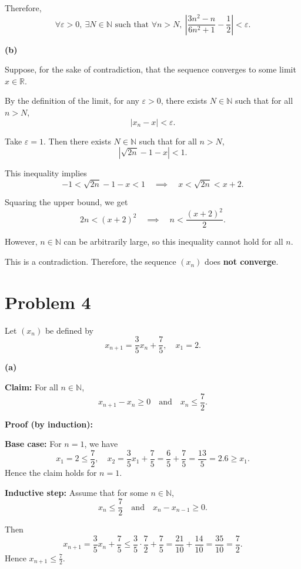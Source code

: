 \documentclass[12pt]{article}
\begin{document}
Therefore,
\[
	\forall \varepsilon > 0, \ \exists N \in \mathbb{N} \text{ such that } \forall n > N, \
	\left| \frac{3n^2 - n}{6n^2 + 1} - \frac{1}{2} \right| < \varepsilon.
\]

\bigskip

\textbf{(b)}

Suppose, for the sake of contradiction, that the sequence converges to some limit $x \in \mathbb{R}$.

By the definition of the limit, for any $\varepsilon > 0$, there exists $N \in \mathbb{N}$ such that for all $n > N$,
\[
	|x_n - x| < \varepsilon.
\]

Take $\varepsilon = 1$. Then there exists $N \in \mathbb{N}$ such that for all $n > N$,
\[
	\left| \sqrt{2n} - 1 - x \right| < 1.
\]

This inequality implies
\[
	-1 < \sqrt{2n} - 1 - x < 1 \quad \implies \quad x < \sqrt{2n} < x + 2.
\]

Squaring the upper bound, we get
\[
	2n < (x + 2)^2 \quad \implies \quad n < \frac{(x + 2)^2}{2}.
\]

However, $n \in \mathbb{N}$ can be arbitrarily large, so this inequality cannot hold for all $n$.

This is a contradiction. Therefore, the sequence $(x_n)$ does \textbf{not converge}.


\section*{Problem 4}

Let $(x_n)$ be defined by
\[
	x_{n+1} = \frac{3}{5}x_n + \frac{7}{5}, \quad x_1 = 2.
\]

\textbf{(a)}

\textbf{Claim:} For all $n \in \mathbb{N}$,
\[
	x_{n+1} - x_n \ge 0 \quad \text{and} \quad x_n \le \frac{7}{2}.
\]

\textbf{Proof (by induction):}

\textbf{Base case:} For $n=1$, we have
\[
	x_1 = 2 \le \frac{7}{2}, \quad x_2 = \frac{3}{5}x_1 + \frac{7}{5} = \frac{6}{5} + \frac{7}{5} = \frac{13}{5} = 2.6 \ge x_1.
\]
Hence the claim holds for $n=1$.

\textbf{Inductive step:} Assume that for some $n \in \mathbb{N}$,
\[
	x_n \le \frac{7}{2} \quad \text{and} \quad x_{n} - x_{n-1} \ge 0.
\]

Then
\[
	x_{n+1} = \frac{3}{5}x_n + \frac{7}{5} \le \frac{3}{5} \cdot \frac{7}{2} + \frac{7}{5} = \frac{21}{10} + \frac{14}{10} = \frac{35}{10} = \frac{7}{2}.
\]
Hence \(x_{n+1} \le \frac{7}{2}\).
\end{document}
